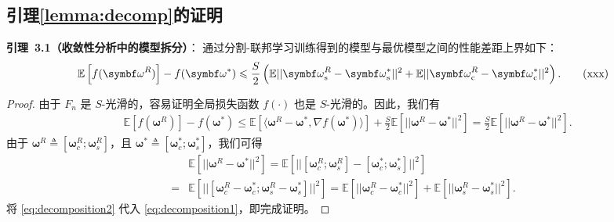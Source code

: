 \chapter{}
\section{引理\ref{lemma:decomp}的证明}\label{app:lemma1}
\noindent \textbf{引理~3.1（收敛性分析中的模型拆分）}：
通过分割-联邦学习训练得到的模型与最优模型之间的性能差距上界如下：
\begin{equation}
\mathbb{E}\left[f(\omegab^{R})\right]- f(\omegab^*)\le\frac{S}{2}\left(\mathbb{E}||\omegabs^{R}-\omegabs^*||^2+\mathbb{E}||\omegabc^{R}-\omegabc^*||^2\right).
\tag{xxx}
\end{equation}

\begin{proof}
由于 $F_n$ 是 $S$-光滑的，容易证明全局损失函数 $f(\cdot)$ 也是 $S$-光滑的。因此，我们有
\begin{equation}\label{eq:decomposition1}
\begin{aligned}
&\mathbb{E}\left[f(\boldsymbol{\omega}^
{R})\right]\!-\!f(\boldsymbol{\omega}^*)\!\le\!\mathbb{E}\!\left[\!\langle\boldsymbol{\omega}^
{R}\!-\!\boldsymbol{\omega}^*,\nabla f(\boldsymbol{\omega}^*)\rangle\right]
\!+\!\frac{S}{2}\mathbb{E}\left[||\boldsymbol{\omega}^{R}\!-\!\boldsymbol{\omega}^*||^2\right]\!=\!\frac{S}{2}\mathbb{E}\left[||\boldsymbol{\omega}^{R}\!-\!\boldsymbol{\omega}^*||^2\right].
\end{aligned}
\end{equation}
由于 $\boldsymbol{\omega}^{R}\triangleq [\boldsymbol{\omega}_c^{R};\boldsymbol{\omega}_s^{R}]$，且 $\boldsymbol{\omega}^*\triangleq [\boldsymbol{\omega}_c^*; \boldsymbol{\omega}_s^*]$，我们可得
   \begin{equation}\label{eq:decomposition2}
   \begin{aligned}
   &\mathbb{E}\left[||\boldsymbol{\omega}^{R}-\boldsymbol{\omega}^*||^2\right]
   =\mathbb{E}\left[||[\boldsymbol{\omega}_c^{R};\boldsymbol{\omega}_s^{R}]-[\boldsymbol{\omega}_c^*; \boldsymbol{\omega}_s^*]||^2\right]\\
   =&\mathbb{E}\left[||[\boldsymbol{\omega}_c^{R}-\boldsymbol{\omega}_c^*; \boldsymbol{\omega}_s^{R}-\boldsymbol{\omega}_s^*]||^2\right]
   =\mathbb{E}\left[||\boldsymbol{\omega}_c^{R}-\boldsymbol{\omega}_c^*||^2\right]+\mathbb{E}\left[||\boldsymbol{\omega}_s^{R}-\boldsymbol{\omega}_s^*||^2\right].
   \end{aligned}
   \end{equation}
   将 \ref{eq:decomposition2} 代入 \ref{eq:decomposition1}，即完成证明。
\end{proof}
